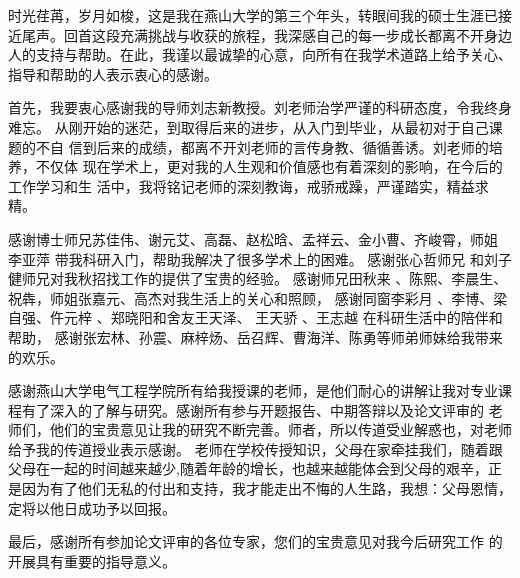 \makeatletter
{}
  \pagestyle{fancy}%
  \fancyhf{}
\makeatother

\begin{thanks}
\begin{comment}
\end{comment}
时光荏苒，岁月如梭，这是我在燕山大学的第三个年头，转眼间我的硕士生涯已接近尾声。回首这段充满挑战与收获的旅程，我深感自己的每一步成长都离不开身边人的支持与帮助。在此，我谨以最诚挚的心意，向所有在我学术道路上给予关心、指导和帮助的人表示衷心的感谢。

首先，我要衷心感谢我的导师刘志新教授。刘老师治学严谨的科研态度，令我终身难忘。
从刚开始的迷茫，到取得后来的进步，从入门到毕业，从最初对于自己课题的不自
信到后来的成绩，都离不开刘老师的言传身教、循循善诱。刘老师的培养，不仅体
现在学术上，更对我的人生观和价值感也有着深刻的影响，在今后的工作学习和生
活中，我将铭记老师的深刻教诲，戒骄戒躁，严谨踏实，精益求精。

 感谢博士师兄苏佳伟、谢元艾、高磊、赵松晗、孟祥云、金小曹、齐峻霄，师姐 李亚萍 带我科研入门，帮助我解决了很多学术上的困难。
 感谢张心哲师兄  和刘子健师兄对我秋招找工作的提供了宝贵的经验。
 感谢师兄田秋来 、陈熙、李晨生、祝犇，师姐张嘉元、高杰对我生活上的关心和照顾，
 感谢同窗李彩月 、李博、梁自强、仵元梓 、郑晓阳和舍友王天泽、 王天骄 、王志越  在科研生活中的陪伴和帮助，%
 感谢张宏林、孙震、麻梓炀、岳召辉、曹海洋、陈勇等师弟师妹给我带来的欢乐。

 感谢燕山大学电气工程学院所有给我授课的老师，是他们耐心的讲解让我对专业课程有了深入的了解与研究。感谢所有参与开题报告、中期答辩以及论文评审的
老师们，他们的宝贵意见让我的研究不断完善。师者，所以传道受业解惑也，对老师给予我的传道授业表示感谢。
老师在学校传授知识，父母在家牵挂我们，随着跟父母在一起的时间越来越少,随着年龄的增长，也越来越能体会到父母的艰辛，正是因为有了他们无私的付出和支持，我才能走出不悔的人生路，我想：父母恩情，定将以他日成功予以回报。

最后，感谢所有参加论文评审的各位专家，您们的宝贵意见对我今后研究工作
的开展具有重要的指导意义。


\end{thanks}
